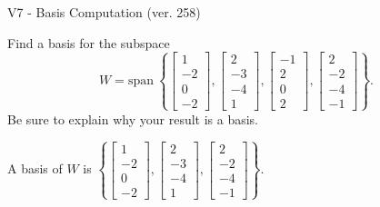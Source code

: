 \begin{exercise}
  \begin{exerciseTitle}V7 - Basis Computation (ver. 258)\end{exerciseTitle}
  \begin{exerciseStatement}
    Find a basis for the subspace 
\[W=\mathrm{span}\ \left\{\left[\begin{array}{r}
1 \\
-2 \\
0 \\
-2
\end{array}\right] , \left[\begin{array}{r}
2 \\
-3 \\
-4 \\
1
\end{array}\right] , \left[\begin{array}{r}
-1 \\
2 \\
0 \\
2
\end{array}\right] , \left[\begin{array}{r}
2 \\
-2 \\
-4 \\
-1
\end{array}\right]\right\}.\]
 Be sure to explain why your result is a basis.


  \end{exerciseStatement}
  \begin{exerciseAnswer}
   A basis of \(W\) is  \(\left\{\left[\begin{array}{r}
1 \\
-2 \\
0 \\
-2
\end{array}\right] , \left[\begin{array}{r}
2 \\
-3 \\
-4 \\
1
\end{array}\right] , \left[\begin{array}{r}
2 \\
-2 \\
-4 \\
-1
\end{array}\right]\right\}\).
  


  \end{exerciseAnswer}
\end{exercise}